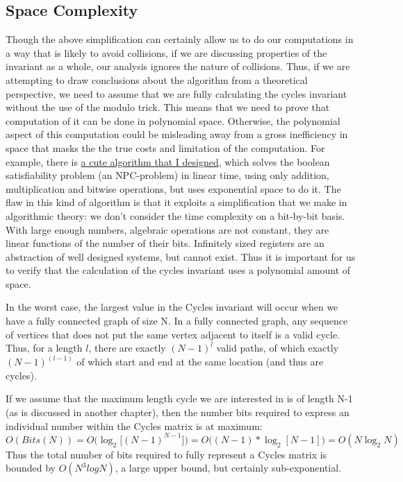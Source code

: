 \subsection{Space Complexity}
Though the above simplification can certainly allow us to do our computations in a way that is likely to avoid collisions, if we are discussing properties of the invariant as a whole, our analysis ignores the nature of collisions.
Thus, if we are attempting to draw conclusions about the algorithm from a theoretical perspective, we need to assume that we are fully calculating the cycles invariant without the use of the modulo trick.
This means that we need to prove that computation of it can be done in polynomial space.
Otherwise, the polynomial aspect of this computation could be misleading away from a gross inefficiency in space that masks the the true costs and limitation of the computation.
For example, there is \href{http://www.github.com/gbdubs/bytes}{a cute algorithm that I designed}, which solves the boolean satisfiability problem (an NPC-problem) in linear time, using only addition, multiplication and bitwise operations, but uses exponential space to do it. 
The flaw in this kind of algorithm is that it exploits a simplification that we make in algorithmic theory: we don't consider the time complexity on a bit-by-bit basis.
With large enough numbers, algebraic operations are not constant, they are linear functions of the number of their bits.
Infinitely sized registers are an abstraction of well designed systems, but cannot exist.
Thus it is important for us to verify that the calculation of the cycles invariant uses a polynomial amount of space.

In the worst case, the largest value in the Cycles invariant will occur when we have a fully connected graph of size N.
In a fully connected graph, any sequence of vertices that does not put the same vertex adjacent to itself is a valid cycle.
Thus, for a length $l$, there are exactly $(N-1)^l$ valid paths, of which exactly $(N-1)^{(l-1)}$ of which start and end at the same location (and thus are cycles).

If we assume that the maximum length cycle we are interested in is of length N-1 (as is discussed in another chapter), then the number bits required to express an individual number within the Cycles matrix is at maximum:
$$ O(Bits(N)) = O\Big( \log_2 \big[(N-1)^{N-1}\big] \Big) = O \big( (N - 1) * \log_2 [N-1] \big) = O(N \log_2 N)$$
Thus the total number of bits required to fully represent a Cycles matrix is bounded by $O(N^3logN)$, a large upper bound, but certainly sub-exponential.


